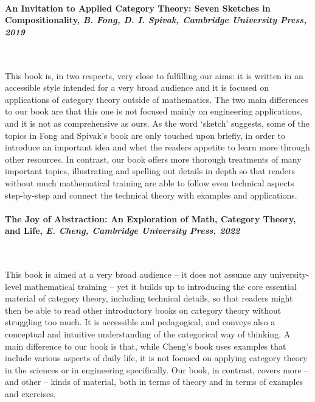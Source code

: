 \documentclass[10pt, article, one side]{memoir}
\begin{document}
    \paragraph{An Invitation to Applied Category Theory: Seven Sketches in Compositionality, \emph{B.
            Fong, D.
            I.
            Spivak, Cambridge University Press, 2019}~\cite{fong2019invitation}}
    \

    This book is, in two respects, very close to fulfilling our aims: it is written in an accessible style intended for a very broad audience and it is focused on applications of category theory outside of mathematics.
    The two main differences to our book are that this one is not focused mainly on engineering applications, and it is not as comprehensive as ours.
    As the word `sketch' suggests, some of the topics in Fong and Spivak's book are only touched upon briefly, in order to introduce an important idea and whet the readers appetite to learn more through other resources.
    In contrast, our book offers more thorough treatments of many important topics, illustrating and spelling out details in depth so that readers without much mathematical training are able to follow even technical aspects step-by-step and connect the technical theory with examples and applications.

    \paragraph{The Joy of Abstraction: An Exploration of Math, Category Theory, and Life, \emph{E.
            Cheng, Cambridge University Press, 2022}~\cite{cheng2022joy}}
    \

    This book is aimed at a very broad audience -- it does not assume any university-level mathematical training -- yet it builds up to introducing the core essential material of category theory, including technical details, so that readers might then be able to read other introductory books on category theory without struggling too much.
    It is accessible and pedagogical, and conveys also a conceptual and intuitive understanding of the categorical way of thinking.
    A main difference to our book is that, while Cheng's book uses examples that include various aspects of daily life, it is not focused on applying category theory in the sciences or in engineering specifically.
    Our book, in contrast, covers more -- and other -- kinds of material, both in terms of theory and in terms of examples and exercises.
\end{document}
